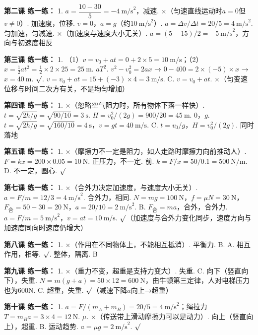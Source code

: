 \documentclass[a4paper,12pt]{ctexart}
\begin{document}
\textbf{第二课 练一练：}
1. $a = \dfrac{10-30}{5} = -4\ \text{m/s}^2$，减速. ×（匀速直线运动时$a=0$但$v\neq0$）. 加速度，位移. $v=0$，$a=g$（约$10\ \text{m/s}^2$）. $a=\Delta v/\Delta t=20/5=4\ \text{m/s}^2$. 匀加速，匀减速. ×（加速度与速度大小无关）. $a=(5-15)/2=-5\ \text{m/s}^2$，方向与初速度相反

\textbf{第三课 练一练：}
1. （1）$v=v_0+at=0+2\times5=10\ \text{m/s}$；\quad（2）$x=\frac{1}{2}at^2=\frac{1}{2}\times2\times25=25\ \text{m}$. $aT^2$. $v^2-v_0^2=2ax$ → $0-400=2\times(-5)\times x$ → $x=40\ \text{m}$. $\surd$. $v=v_0+at=15+(-3)\times4=3\ \text{m/s}$. C. $v=v_0+at$. ×（匀变速位移与时间二次方有关，不是均匀增加）

\textbf{第四课 练一练：}
1. ×（忽略空气阻力时，所有物体下落一样快）. $t=\sqrt{2h/g}=\sqrt{90/10}=3\ \text{s}$. $H=v_0^2/(2g)=900/20=45\ \text{m}$. 0，$g$. $t=\sqrt{2h/g}=\sqrt{160/10}=4\ \text{s}$，$v=gt=40\ \text{m/s}$. C. $t=v_0/g$，$H=v_0^2/(2g)$. 同时落地

\textbf{第五课 练一练：}
1. ×（摩擦力不一定是阻力，如人走路时摩擦力向前推动人）. $F=kx=200\times0.05=10\ \text{N}$. 正压力，不一定. 前. $k=F/x=50/0.1=500\ \text{N/m}$. D. 不一定，圆心. $\surd$

\textbf{第七课 练一练：}
1. ×（合外力决定加速度，与速度大小无关）. $a=F/m=12/3=4\ \text{m/s}^2$. 合外力，相同. $N=mg=100\ \text{N}$，$f=\mu N=30\ \text{N}$，$F_{\text{合}}=50-30=20\ \text{N}$，$a=20/10=2\ \text{m/s}^2$. B. $F_{\text{合}}=ma$，合外，合外力. $a=F/m=5\ \text{m/s}^2$，$v=at=10\ \text{m/s}$. $\surd$（加速度与合外力变化同步，速度方向与加速度同向时速度仍增大）

\textbf{第八课 练一练：}
1. ×（作用在不同物体上，不能相互抵消）. 平衡力. B. A. 相互作用，相等. $\surd$. 整体，隔离. B

\textbf{第九课 练一练：}
1. ×（重力不变，超重是支持力变大）. 失重. C. 向下（竖直向下），失重. $N=m(g+a)=50\times12=600\ \text{N}$，由牛顿第三定律，人对电梯压力也为600N. C. 超重，失重. $\surd$（减速下降$a$向上→超重）

\textbf{第十课 练一练：}
1. $a=F/(m_A+m_B)=20/5=4\ \text{m/s}^2$；绳拉力$T=m_Ba=3\times4=12\ \text{N}$. $\mu$. ×（传送带上滑动摩擦力可以是动力）. 向上（竖直向上），超重. B. 运动趋势. $a=\mu g=2\ \text{m/s}^2$. $\surd$
\end{document}

